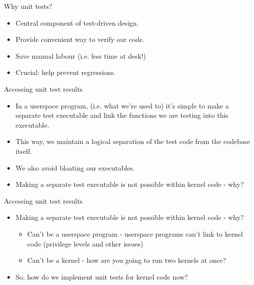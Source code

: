 \documentclass{beamer}
\begin{document}
\begin{frame}{Why unit tests?}

  \begin{itemize}

  \item Central component of test-driven design.
  \item Provide convenient way to verify our code.
  \item Save manual labour (i.e. less time at desk!)
  \item Crucial: help prevent regressions.

  \end{itemize}

\end{frame}

\begin{frame}{Accessing unit test results}

  \begin{itemize}
    \item In a userspace program, (i.e. what we're used to) it's
      simple to make a separate test executable and link the functions
      we are testing into this executable.
    \item This way, we maintain a logical separation of the test code
      from the codebase itself.
    \item We also avoid bloating our executables.
    \item Making a separate test executable is not possible within
      kernel code - why?
  \end{itemize}

\end{frame}

\begin{frame}{Accessing unit test results}

  \begin{itemize}
    \item Making a separate test executable is not possible within
      kernel code - why?
      \begin{itemize}
        \item Can't be a userspace program - userspace programs can't
          link to kernel code (privilege levels and other issues)
        \item Can't be a kernel - how are you going to run two kernels
          at once?
      \end{itemize}
    \item So, how do we implement unit tests for kernel code now?
  \end{itemize}

\end{frame}
\end{document}
